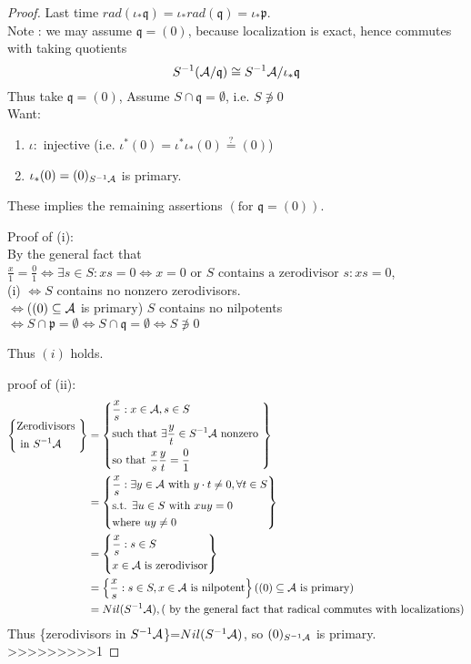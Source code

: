 \documentclass[11pt]{article}
\newcommand{\scp}{{\mathfrak p}}
\newcommand{\scq}{\mathfrak q}
\newcommand{\cala}{{\cal A}}
\newcommand{\Llrta}{\Longleftrightarrow}
\begin{document}
\begin{proof}
Last time $rad(\iota_*\scq)=\iota_*rad(\scq)=\iota_*\scp$.\\
Note : we may assume $\scq=(0)$, because localization is exact, hence commutes with taking quotients
$$
S^{-1}(\cala/\scq)\cong S^{-1}\cala/\iota_*\scq
$$
Thus take $\scq=(0)$, Assume $S\cap \scq=\emptyset$, i.e.  $S\not \ni 0$\\
Want:
\begin{enumerate}[label=(\roman*)]
\item $\iota:$ injective (i.e. $\iota^*(0)=\iota^*\iota_*(0)\overset{?}{=}(0)$)
\item $\iota_*(0)=(0)_{S^{-1}\cala}$ is primary.
\end{enumerate}
These implies the remaining assertions $(\text{for }\scq=(0))$.

Proof of (i):\\
By the general fact that $\frac{x}{1}=\frac{0}{1}\Llrta \exists s\in S : xs=0\Llrta x=0 \text{ or } S \text{ contains a zerodivisor }s : xs=0$,\\
 (i) $\Llrta S$ contains no nonzero zerodivisors. \\
$\Llrta$($(0)\subseteq \cala$ is primary) $S$ contains no nilpotents\\
$\Llrta S\cap \scp =\emptyset\Llrta S\cap \scq=\emptyset\Llrta S\not \ni 0$

Thus $(i)$ holds.

proof of (ii):
$$
\begin{aligned}
\left\{
\begin{aligned}
& \text{Zerodivisors }\\
&\text{ in } S^{-1}\cala
\end{aligned}
\right\}
&
=\left\{
\begin{aligned}
& \frac{x}{s}:x\in\cala, s\in S\\
& \text{such that } \exists\frac{y}{t}\in S^{-1}\cala \text{ nonzero }\\
& \text{so that } \frac{x}{s}\frac{y}{t}=\frac{0}{1} 
\end{aligned}
\right\}\\
& =\left\{
\begin{aligned}
&\frac{x}{s}:\exists y\in\cala\text{ with } y\cdot t\neq 0,\forall t\in S\\
& \text{s.t. } \exists u\in S \text{ with } xuy =0\\
&\text{where } uy \neq 0
\end{aligned}
\right\}\\
&=\left\{
\begin{aligned}
& \frac{x}{s}: s\in S\\
& x\in \cala \text{ is  zerodivisor}
\end{aligned}
\right\}\\
&=\left\{ \frac{x}{s}: s\in S, x\in \cala\text{ is nilpotent}\right\}((0)\subseteq \cala\text{ is primary})\\
&=Nil(S^{-1}\cala),(\text{ by the general fact that radical commutes with localizations})
\end{aligned}
$$
Thus \{zerodivisors in $S^{-1}\cala$\}=$Nil(S^{-1}\cala)$, so $(0)_{S^{-1}\cala}$ is primary.
>>>>>>>>>1




\end{proof}
\end{document}
